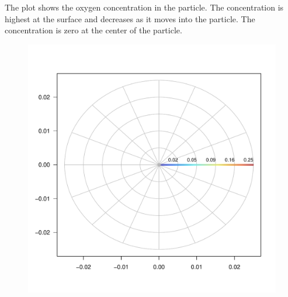 \documentclass{tufte-handout}\usepackage[]{graphicx}\usepackage[]{xcolor}
\makeatletter
\def\maxwidth{ %
  \ifdim\Gin@nat@width>\linewidth
    \linewidth
  \else
    \Gin@nat@width
  \fi
}
\newenvironment{knitrout}{}{} %
\makeatother
\begin{document}
The plot shows the oxygen concentration in the particle. The concentration is highest at the surface and decreases as it moves into the particle. The concentration is zero at the center of the particle.

\begin{figure}[h]
\begin{knitrout}
\color{fgcolor}
\includegraphics[width=\maxwidth]{figure/circleplot-1} 
\end{knitrout}
\end{figure}








\end{document}
